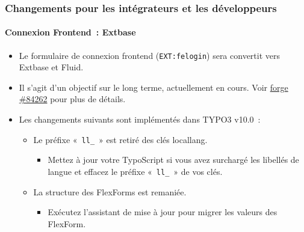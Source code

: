 \begin{frame}[fragile]
	\frametitle{Changements pour les intégrateurs et les développeurs}
	\framesubtitle{Connexion Frontend~: Extbase}

	\begin{itemize}
		\item Le formulaire de connexion frontend (\texttt{EXT:felogin}) sera convertit vers Extbase et Fluid.

		\item Il s'agit d'un objectif sur le long terme, actuellement en cours.\newline
			Voir \href{https://forge.typo3.org/issues/84262}{forge \#84262} pour plus de détails.

		\item Les changements suivants sont implémentés dans TYPO3 v10.0~:

		\begin{itemize}
			\item[\ding{202}] Le préfixe «~\texttt{ll\_}~» est retiré des clés locallang.

				\begin{itemize}
					\item[\ding{228}] Mettez à jour votre TypoScript si vous avez surchargé les libellés de langue et effacez le préfixe «~\texttt{ll\_}~» de vos clés.
				\end{itemize}

			\item[\ding{203}] La structure des FlexForms est remaniée.

				\begin{itemize}
					\item[\ding{228}] Exécutez l'assistant de mise à jour pour migrer les valeurs des FlexForm.
				\end{itemize}

		\end{itemize}

	\end{itemize}

\end{frame}


